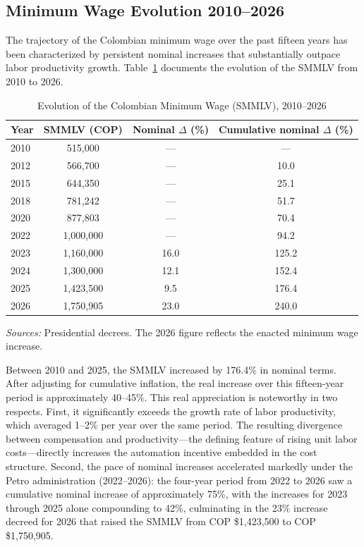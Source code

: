 \documentclass{article}
\begin{document}
\subsection{Minimum Wage Evolution 2010--2026}
\label{subsec:min_wage}

The trajectory of the Colombian minimum wage over the past fifteen years has been characterized by persistent nominal increases that substantially outpace labor productivity growth. Table~\ref{tab:min_wage} documents the evolution of the SMMLV from 2010 to 2026.

\begin{table}[htbp]
\centering
\caption{Evolution of the Colombian Minimum Wage (SMMLV), 2010--2026}
\label{tab:min_wage}
\begin{threeparttable}
\begin{tabular}{lccc}
\toprule
\textbf{Year} & \textbf{SMMLV (COP)} & \textbf{Nominal $\Delta$ (\%)} & \textbf{Cumulative nominal $\Delta$ (\%)} \\
\midrule
2010 & 515,000 & --- & --- \\
2012 & 566,700 & --- & 10.0 \\
2015 & 644,350 & --- & 25.1 \\
2018 & 781,242 & --- & 51.7 \\
2020 & 877,803 & --- & 70.4 \\
2022 & 1,000,000 & --- & 94.2 \\
2023 & 1,160,000 & 16.0 & 125.2 \\
2024 & 1,300,000 & 12.1 & 152.4 \\
2025 & 1,423,500 & 9.5 & 176.4 \\
2026 & 1,750,905 & 23.0 & 240.0 \\
\bottomrule
\end{tabular}
\begin{tablenotes}
\small
\item \textit{Sources:} Presidential decrees. The 2026 figure reflects the enacted minimum wage increase.
\end{tablenotes}
\end{threeparttable}
\end{table}

Between 2010 and 2025, the SMMLV increased by 176.4\% in nominal terms. After adjusting for cumulative inflation, the real increase over this fifteen-year period is approximately 40--45\%. This real appreciation is noteworthy in two respects. First, it significantly exceeds the growth rate of labor productivity, which averaged 1--2\% per year over the same period. The resulting divergence between compensation and productivity---the defining feature of rising unit labor costs---directly increases the automation incentive embedded in the cost structure. Second, the pace of nominal increases accelerated markedly under the Petro administration (2022--2026): the four-year period from 2022 to 2026 saw a cumulative nominal increase of approximately 75\%, with the increases for 2023 through 2025 alone compounding to 42\%, culminating in the 23\% increase decreed for 2026 that raised the SMMLV from COP \$1,423,500 to COP \$1,750,905.
\end{document}
